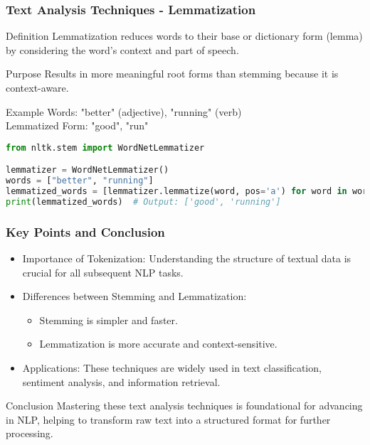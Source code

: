 \documentclass[aspectratio=169]{beamer}
\begin{document}
\begin{frame}[fragile]
    \frametitle{Text Analysis Techniques - Lemmatization}
    \begin{block}{Definition}
        Lemmatization reduces words to their base or dictionary form (lemma) by considering the word's context and part of speech.
    \end{block}
    
    \begin{block}{Purpose}
        Results in more meaningful root forms than stemming because it is context-aware.
    \end{block}

    \begin{exampleblock}{Example}
        Words: "better" (adjective), "running" (verb) \\
        Lemmatized Form: "good", "run"
    \end{exampleblock}
    
    \begin{lstlisting}[language=Python]
from nltk.stem import WordNetLemmatizer

lemmatizer = WordNetLemmatizer()
words = ["better", "running"]
lemmatized_words = [lemmatizer.lemmatize(word, pos='a') for word in words]  # 'a' for adjectives
print(lemmatized_words)  # Output: ['good', 'running']
    \end{lstlisting}
\end{frame}

\begin{frame}[fragile]
    \frametitle{Key Points and Conclusion}
    \begin{itemize}
        \item Importance of Tokenization: Understanding the structure of textual data is crucial for all subsequent NLP tasks.
        \item Differences between Stemming and Lemmatization:
        \begin{itemize}
            \item Stemming is simpler and faster.
            \item Lemmatization is more accurate and context-sensitive.
        \end{itemize}
        \item Applications: These techniques are widely used in text classification, sentiment analysis, and information retrieval.
    \end{itemize}
    
    \begin{block}{Conclusion}
        Mastering these text analysis techniques is foundational for advancing in NLP, helping to transform raw text into a structured format for further processing.
    \end{block}
\end{frame}
\end{document}
